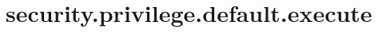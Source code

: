 \section{security.privilege.default.execute}
\label{configuration:SecurityPrivilegeDefaultExecute}
\AvailableInJavaOnly{\TODO}
